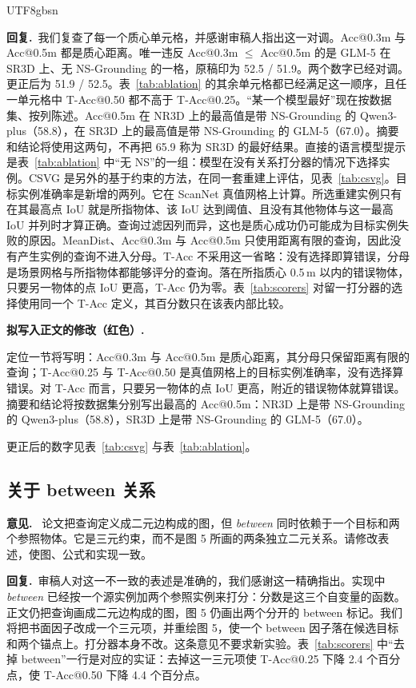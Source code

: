 \documentclass[11pt]{article}
\newcommand{\revcomment}[1]{%
  \par\vspace{0.6em}\noindent\textcolor{revblue}{\textbf{意见.}}\ %
  \textcolor{revblue}{#1}\par\vspace{0.4em}}
\newcommand{\revresponse}[1]{%
  \par\noindent\textbf{回复.}\ #1\par\vspace{0.3em}}
\newcommand{\revchange}[1]{%
  \par\noindent\textbf{拟写入正文的修改（红色）.}\par
  \noindent\textcolor{revred}{#1}\par\vspace{0.8em}}
\begin{document}
\begin{CJK*}{UTF8}{gbsn}
\revresponse{我们复查了每一个质心单元格，并感谢审稿人指出这一对调。Acc@0.3m 与 Acc@0.5m 都是质心距离。唯一违反 Acc@0.3m \(\le\) Acc@0.5m 的是 GLM-5 在 SR3D 上、无 NS-Grounding 的一格，原稿印为 52.5 / 51.9。两个数字已经对调。更正后为 51.9 / 52.5。表~\ref{tab:ablation} 的其余单元格都已经满足这一顺序，且任一单元格中 T-Acc@0.50 都不高于 T-Acc@0.25。“某一个模型最好”现在按数据集、按列陈述。Acc@0.5m 在 NR3D 上的最高值是带 NS-Grounding 的 Qwen3-plus（58.8），在 SR3D 上的最高值是带 NS-Grounding 的 GLM-5（67.0）。摘要和结论将使用这两句，不再把 65.9 称为 SR3D 的最好结果。直接的语言模型提示是表~\ref{tab:ablation} 中“无 NS”的一组：模型在没有关系打分器的情况下选择实例。CSVG 是另外的基于约束的方法，在同一套重建上评估，见表~\ref{tab:csvg}。目标实例准确率是新增的两列。它在 ScanNet 真值网格上计算。所选重建实例只有在其最高点 IoU 就是所指物体、该 IoU 达到阈值、且没有其他物体与这一最高 IoU 并列时才算正确。查询过滤因列而异，这也是质心成功仍可能成为目标实例失败的原因。MeanDist、Acc@0.3m 与 Acc@0.5m 只使用距离有限的查询，因此没有产生实例的查询不进入分母。T-Acc 不采用这一省略：没有选择即算错误，分母是场景网格与所指物体都能够评分的查询。落在所指质心 0.5\,m 以内的错误物体，只要另一物体的点 IoU 更高，T-Acc 仍为零。表~\ref{tab:scorers} 对留一打分器的选择使用同一个 T-Acc 定义，其百分数只在该表内部比较。}

\revchange{定位一节将写明：Acc@0.3m 与 Acc@0.5m 是质心距离，其分母只保留距离有限的查询；T-Acc@0.25 与 T-Acc@0.50 是真值网格上的目标实例准确率，没有选择算错误。对 T-Acc 而言，只要另一物体的点 IoU 更高，附近的错误物体就算错误。摘要和结论将按数据集分别写出最高的 Acc@0.5m：NR3D 上是带 NS-Grounding 的 Qwen3-plus（58.8），SR3D 上是带 NS-Grounding 的 GLM-5（67.0）。}

\noindent 更正后的数字见表~\ref{tab:csvg} 与表~\ref{tab:ablation}。

\subsection*{关于 between 关系}

\revcomment{论文把查询定义成二元边构成的图，但 \emph{between} 同时依赖于一个目标和两个参照物体。它是三元约束，而不是图 5 所画的两条独立二元关系。请修改表述，使图、公式和实现一致。}

\revresponse{审稿人对这一不一致的表述是准确的，我们感谢这一精确指出。实现中 \emph{between} 已经按一个源实例加两个参照实例来打分：分数是这三个自变量的函数。正文仍把查询画成二元边构成的图，图 5 仍画出两个分开的 between 标记。我们将把书面因子改成一个三元项，并重绘图 5，使一个 between 因子落在候选目标和两个锚点上。打分器本身不改。这条意见不要求新实验。表~\ref{tab:scorers} 中“去掉 between”一行是对应的实证：去掉这一三元项使 T-Acc@0.25 下降 2.4 个百分点，使 T-Acc@0.50 下降 4.4 个百分点。}


\end{CJK*}
\end{document}
